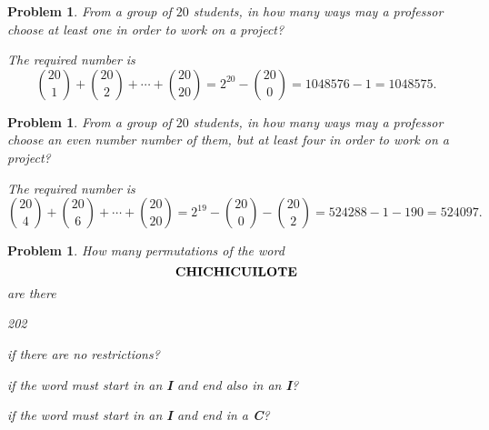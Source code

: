 \documentclass[11pt, openany]{book}
\theoremstyle{change} \theoremheaderfont{\blue\sffamily\bfseries}
\newtheorem{pro}[thm]{Problem}
\theoremstyle{nonumberplain} \theoremheaderfont{\sffamily\bfseries}
\def\binom#1#2{{#1\choose#2}}
\newcommand{\í}{\'{\i}}
\begin{document}
\begin{multicols}{2}
\begin{pro}
From a group of $20$ students, in how many ways may a professor
choose at least one in order to work on a project? \begin{answer}
The required number is $$\binom{20}{1} + \binom{20}{2} + \cdots +
\binom{20}{20} = 2^{20} - \binom{20}{0} = 1048576 - 1 = 1048575.
$$
\end{answer}
\end{pro}

\begin{pro}
From a group of $20$ students, in how many ways may a professor
choose an even number number of them, but at least four in order to
work on a project? \begin{answer} The required number is
$$\binom{20}{4} + \binom{20}{6} + \cdots + \binom{20}{20} = 2^{19} -
\binom{20}{0} - \binom{20}{2} = 524288 - 1-190 = 524097.
$$
\end{answer}
\end{pro}
  \begin{pro}How many permutations of the word
$${\bf CHICHICUILOTE}   $$are there
\begin{dingautolist}{202}
\item if there are no restrictions?





 \item if the word must
start in an {\bf I} and end also in an {\bf I}?





\item
if the word must start in an {\bf I} and end in a {\bf C}?\\





\end{dingautolist}
\end{pro}
\end{multicols}
\end{document}
